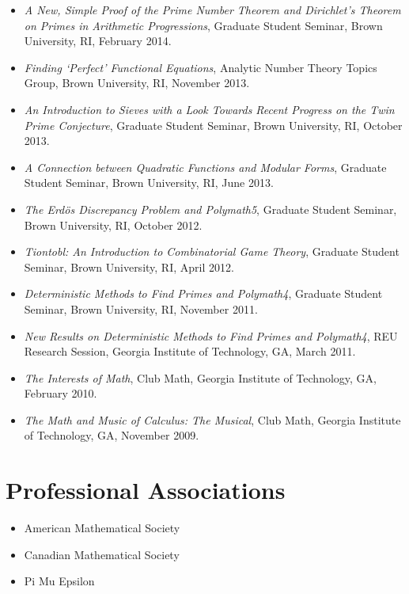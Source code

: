 \begin{itemize}
    \item \emph{A New, Simple Proof of the Prime Number Theorem and Dirichlet's Theorem on
      Primes in Arithmetic Progressions},
      Graduate Student Seminar,
      Brown University, RI,
      February 2014.

    \item \emph{Finding `Perfect' Functional Equations},
      Analytic Number Theory Topics Group,
      Brown University, RI,
      November 2013.

    \item \emph{An Introduction to Sieves with a Look Towards Recent Progress on the Twin
      Prime Conjecture},
      Graduate Student Seminar,
      Brown University, RI,
      October 2013.

    \item \emph{A Connection between Quadratic Functions and Modular Forms},
      Graduate Student Seminar,
      Brown University, RI,
      June 2013.

    \item \emph{The Erd\"os Discrepancy Problem and Polymath5},
      Graduate Student Seminar,
      Brown University, RI,
      October 2012.

    \item \emph{Tiontobl: An Introduction to Combinatorial Game Theory},
      Graduate Student Seminar,
      Brown University, RI,
      April 2012.

    \item \emph{Deterministic Methods to Find Primes and Polymath4},
      Graduate Student Seminar,
      Brown University, RI,
      November 2011.

    \item \emph{New Results on Deterministic Methods to Find Primes and Polymath4},
      REU Research Session,
      Georgia Institute of Technology, GA,
      March 2011.

    \item \emph{The Interests of Math},
      Club Math,
      Georgia Institute of Technology, GA,
      February 2010.

    \item \emph{The Math and Music of Calculus: The Musical},
      Club Math,
      Georgia Institute of Technology, GA,
      November 2009.

\end{itemize}

\section*{Professional Associations}

\begin{itemize}
  \item American Mathematical Society
  \item Canadian Mathematical Society
  \item Pi Mu Epsilon
\end{itemize}

